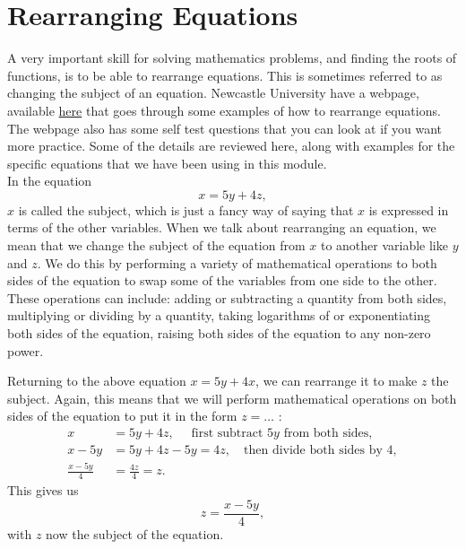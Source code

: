 \section{Rearranging Equations}
A very important skill for solving mathematics problems, and finding the roots of functions, is to be able to rearrange equations. This is sometimes referred to as changing the subject of an equation. Newcastle University have a webpage, available \href{https://www.mas.ncl.ac.uk/ask/numeracy-maths-statistics/core-mathematics/pure-maths/algebra/rearranging-equations.html}{here} that goes through some examples of how to rearrange equations. The webpage also has some self test questions that you can look at if you want more practice. Some of the details are reviewed here, along with examples for the specific equations that we have been using in this module.\\


In the equation
\begin{equation*}
x=5y+4z,
\end{equation*}
$x$ is called the subject, which is just a fancy way of saying that $x$ is expressed in terms of the other variables. When we talk about rearranging an equation, we mean that we change the subject of the equation from $x$ to another variable like $y$ and $z$. We do this by performing a variety of mathematical operations to both sides of the equation to swap some of the variables from one side to the other. \\

These operations can include: adding or subtracting a quantity from both sides, multiplying or dividing by a quantity, taking logarithms of or exponentiating both sides of the equation, raising both sides of the equation to any non-zero power.\\
\begin{ex}
Returning to the above equation $x=5y+4x$, we can rearrange it to make $z$ the subject. Again, this means that we will perform mathematical operations on both sides of the equation to put it in the form $z=\dots{}$ : 
\begin{align*}
x&=5y+4z, \quad \text{ first subtract $5y$ from both sides},\\
x-5y&=5y+4z-5y=4z, \quad \text{then divide both sides by 4},\\
\frac{x-5y}{4}&=\frac{4z}{4}=z.
\end{align*}
This gives us
\begin{equation*}
z=\frac{x-5y}{4},
\end{equation*}
with $z$ now the subject of the equation.
\end{ex}

